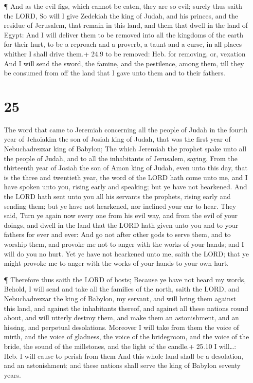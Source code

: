 ¶ And as the evil figs, which cannot be eaten, they are so
evil; surely thus saith the LORD, So will I give Zedekiah the king of
Judah, and his princes, and the residue of Jerusalem, that remain in
this land, and them that dwell in the land of Egypt:  And I
will deliver them to be removed into all the kingdoms of the earth for
their hurt, to be a reproach and a proverb, a taunt and a curse, in all
places whither I shall drive them.+ 24.9 to be removed: Heb. for
removing, or, vexation  And I will send the sword, the
famine, and the pestilence, among them, till they be consumed from off
the land that I gave unto them and to their fathers.

\hypertarget{section-24}{%
\section{25}\label{section-24}}

 The word that came to Jeremiah concerning all the people of
Judah in the fourth year of Jehoiakim the son of Josiah king of Judah,
that was the first year of Nebuchadrezzar king of Babylon; 
The which Jeremiah the prophet spake unto all the people of Judah, and
to all the inhabitants of Jerusalem, saying,  From the
thirteenth year of Josiah the son of Amon king of Judah, even unto this
day, that is the three and twentieth year, the word of the LORD hath
come unto me, and I have spoken unto you, rising early and speaking; but
ye have not hearkened.  And the LORD hath sent unto you all
his servants the prophets, rising early and sending them; but ye have
not hearkened, nor inclined your ear to hear.  They said,
Turn ye again now every one from his evil way, and from the evil of your
doings, and dwell in the land that the LORD hath given unto you and to
your fathers for ever and ever:  And go not after other gods
to serve them, and to worship them, and provoke me not to anger with the
works of your hands; and I will do you no hurt.  Yet ye have
not hearkened unto me, saith the LORD; that ye might provoke me to anger
with the works of your hands to your own hurt.

 ¶ Therefore thus saith the LORD of hosts; Because ye have
not heard my words,  Behold, I will send and take all the
families of the north, saith the LORD, and Nebuchadrezzar the king of
Babylon, my servant, and will bring them against this land, and against
the inhabitants thereof, and against all these nations round about, and
will utterly destroy them, and make them an astonishment, and an
hissing, and perpetual desolations.  Moreover I will take
from them the voice of mirth, and the voice of gladness, the voice of
the bridegroom, and the voice of the bride, the sound of the millstones,
and the light of the candle.+ 25.10 I will\ldots: Heb. I will cause to
perish from them  And this whole land shall be a
desolation, and an astonishment; and these nations shall serve the king
of Babylon seventy years.

